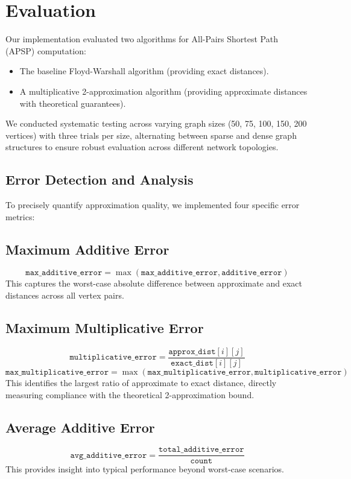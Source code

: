\documentclass[a4paper,11pt,oneside]{book}
\begin{document}
\section{Evaluation}

Our implementation evaluated two algorithms for All-Pairs Shortest Path (APSP) computation:
\begin{itemize}
    \item The baseline Floyd-Warshall algorithm (providing exact distances).
    \item A multiplicative 2-approximation algorithm (providing approximate distances with theoretical guarantees).
\end{itemize}

We conducted systematic testing across varying graph sizes (50, 75, 100, 150, 200 vertices) with three trials per size, alternating between sparse and dense graph structures to ensure robust evaluation across different network topologies.

\subsection{Error Detection and Analysis}

To precisely quantify approximation quality, we implemented four specific error metrics:

\subsection{Maximum Additive Error}
\[
\texttt{max\_additive\_error} = \max(\texttt{max\_additive\_error}, \texttt{additive\_error})
\]
This captures the worst-case absolute difference between approximate and exact distances across all vertex pairs.

\subsection{Maximum Multiplicative Error}
\[
\texttt{multiplicative\_error} = \frac{\texttt{approx\_dist}[i][j]}{\texttt{exact\_dist}[i][j]}
\]
\[
\texttt{max\_multiplicative\_error} = \max(\texttt{max\_multiplicative\_error}, \texttt{multiplicative\_error})
\]
This identifies the largest ratio of approximate to exact distance, directly measuring compliance with the theoretical 2-approximation bound.

\subsection{Average Additive Error}
\[
\texttt{avg\_additive\_error} = \frac{\texttt{total\_additive\_error}}{\texttt{count}}
\]
This provides insight into typical performance beyond worst-case scenarios.
\end{document}
